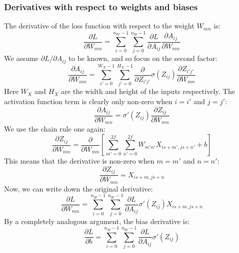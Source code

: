 \documentclass[12pt, a4paper]{article}
\numberwithin{equation}{section}
\begin{document}
\subsubsection{Derivatives with respect to weights and biases}
The derivative of the loss function with respect to the weight $W_{mn}$ is:
\begin{equation}
\frac{\partial L}{\partial W_{mn}}=\sum_{i=0}^{n_W-1}\sum_{j=0}^{n_H-1}\frac{\partial L}{\partial A_{ij}}\frac{\partial A_{ij}}{\partial W_{mn}}
\end{equation}
We assume $\partial L/\partial A_{ij}$ to be known, and so focus on the second factor:
\begin{equation}
\frac{\partial A_{ij}}{\partial W_{mn}}=\sum_{i'=0}^{W_X-1}\sum_{j'=0}^{H_X-1}\frac{\partial}{\partial Z_{i'j'}}\sigma(Z_{ij})\frac{\partial Z_{i'j'}}{\partial W_{mn}}
\end{equation}
Here $W_X$ and $H_X$ are the width and height of the inputs respectively. The activation function term is clearly only non-zero when $i=i'$ and $j=j'$:
\begin{equation}
\frac{\partial A_{ij}}{\partial W_{mn}}=\sigma'(Z_{ij})\frac{\partial Z_{ij}}{\partial W_{mn}}
\end{equation}
We use the chain rule one again:
\begin{equation}
\frac{\partial Z_{ij}}{\partial W_{mn}}=\frac{\partial}{\partial W_{mn}}\left[\sum_{m'=0}^{2f}\sum_{n'=0}^{2f}W_{m'n'}X_{is+m',js+n'}+b\right]
\end{equation}
This means that the derivative is non-zero when $m=m'$ and $n=n'$:
\begin{equation}
\frac{\partial Z_{ij}}{\partial W_{mn}}=X_{is+m,js+n}
\end{equation}
Now, we can write down the original derivative:
\begin{equation}
\frac{\partial L}{\partial W_{mn}}=\sum_{i=0}^{n_H-1}\sum_{j=0}^{n_W-1}\frac{\partial L}{\partial A_{ij}}\sigma'(Z_{ij})X_{is+m,js+n}
\end{equation}
By a completely analogous argument, the bias derivative is:
\begin{equation}
\frac{\partial L}{\partial b}=\sum_{i=0}^{n_H-1}\sum_{j=0}^{n_W-1}\frac{\partial L}{\partial A_{ij}}\sigma'(Z_{ij})
\end{equation}
\end{document}
